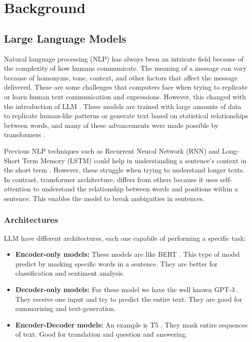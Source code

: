 

\section{Background}

\subsection{Large Language Models}
Natural language processing (NLP) has always been an intricate field because of the complexity of how humans communicate. The meaning of a message can vary because of homonyms, tone, context, and other factors that affect the message delivered. These are some challenges that computers face when trying to replicate or learn human text communication and expressions. However, this changed with the introduction of LLM \cite{naveed2024comprehensiveoverviewlargelanguage}. These models are trained with large amounts of data to replicate human-like patterns or generate text based on statistical relationships between words, and many of these advancements were made possible by transformers \cite{vaswani2023attentionneed}. 

Previous NLP techniques such as Recurrent Neural Network (RNN) and Long-Short Term Memory (LSTM) could help in understanding a sentence's context in the short term \cite{Sherstinsky_2020}. However, these struggle when trying to understand longer texts. In contrast, transformer architecture, differs from others because it uses self-attention to understand the relationship between words and positions within a sentence. This enables the model to break ambiguities in sentences. 

\subsubsection{Architectures}
LLM have different architectures, each one capabile of performing a specific task:

\begin{itemize}
\item{\textbf{Encoder-only models:}} These models are like BERT \cite{DBLP:journals/corr/abs-1810-04805}. This type of model predict by masking specific words in a sentence. They are better for classification and sentiment analysis.
\item{\textbf{Decoder-only models:}} For these model we have the well known GPT-3 \cite{DBLP:journals/corr/abs-2005-14165}. They receive one input and try to predict the entire text. They are good for summarizing and text-generation.
\item{\textbf{Encoder-Decoder models:}} An example is T5 \cite{2020t5}. They mask entire sequences of text. Good for translation and question and answering.
\end{itemize}

